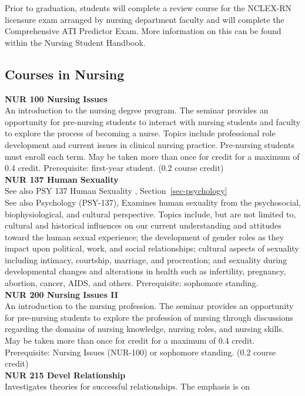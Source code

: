 \documentclass[
  letterpaper,
]{scrbook}
\begin{document}
Prior to graduation, students will complete a review course for the
NCLEX-RN licensure exam arranged by nursing department faculty and will
complete the Comprehensive ATI Predictor Exam. More information on this
can be found within the Nursing Student Handbook.

\subsection{Courses in Nursing}\label{courses-in-nursing}

\textbf{NUR 100 Nursing Issues}\\
An introduction to the nursing degree program. The seminar provides an
opportunity for pre-nursing students to interact with nursing students
and faculty to explore the process of becoming a nurse. Topics include
professional role development and current issues in clinical nursing
practice. Pre-nursing students must enroll each term. May be taken more
than once for credit for a maximum of 0.4 credit. Prerequisite:
first-year student. (0.2 course credit)\\
\textbf{NUR 137 Human Sexuality}\\
See also PSY 137 Human Sexuality , Section~\ref{sec-psychology}\\
See also Psychology (PSY-137), Examines human sexuality from the
psychosocial, biophysiological, and cultural perspective. Topics
include, but are not limited to, cultural and historical influences on
our current understanding and attitudes toward the human sexual
experience; the development of gender roles as they impact upon
political, work, and social relationships; cultural aspects of sexuality
including intimacy, courtship, marriage, and procreation; and sexuality
during developmental changes and alterations in health such as
infertility, pregnancy, abortion, cancer, AIDS, and others.
Prerequisite: sophomore standing.\\
\textbf{NUR 200 Nursing Issues II}\\
An introduction to the nursing profession. The seminar provides an
opportunity for pre-nursing students to explore the profession of
nursing through discussions regarding the domains of nursing knowledge,
nursing roles, and nursing skills. May be taken more than once for
credit for a maximum of 0.4 credit. Prerequisite: Nursing Issues
(NUR-100) or sophomore standing. (0.2 course credit)\\
\textbf{NUR 215 Devel Relationship}\\
Investigates theories for successful relationships. The emphasis is on
\end{document}
